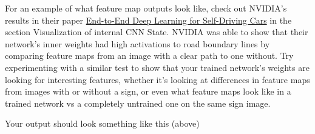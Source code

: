 \documentclass[11pt]{article}
\begin{document}
For an example of what feature map outputs look like, check out NVIDIA's
results in their paper
\href{https://devblogs.nvidia.com/parallelforall/deep-learning-self-driving-cars/}{End-to-End
Deep Learning for Self-Driving Cars} in the section Visualization of
internal CNN State. NVIDIA was able to show that their network's inner
weights had high activations to road boundary lines by comparing feature
maps from an image with a clear path to one without. Try experimenting
with a similar test to show that your trained network's weights are
looking for interesting features, whether it's looking at differences in
feature maps from images with or without a sign, or even what feature
maps look like in a trained network vs a completely untrained one on the
same sign image.

Your output should look something like this (above)
\end{document}
